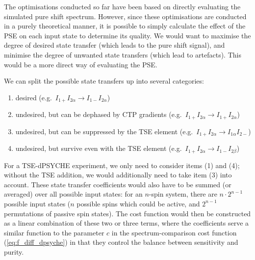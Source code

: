The optimisations conducted so far have been based on directly evaluating the simulated pure shift spectrum.
However, since these optimisations are conducted in a purely theoretical manner, it is possible to simply calculate the effect of the PSE on each input state to determine its quality.
We would want to maximise the degree of desired state transfer (which leads to the pure shift signal), and minimise the degree of unwanted state transfers (which lead to artefacts).
This would be a more direct way of evaluating the PSE.

We can split the possible state transfers up into several categories:
\begin{enumerate}
    \item desired (e.g.\ $I_{1+}I_{2\alpha} \to I_{1-}I_{2\alpha}$)
    \item undesired, but can be dephased by CTP gradients (e.g.\ $I_{1+}I_{2\alpha} \to I_{1+}I_{2\alpha}$)
    \item undesired, but can be suppressed by the TSE element (e.g.\ $I_{1+}I_{2\alpha} \to I_{1\alpha}I_{2-}$)
    \item undesired, but survive even with the TSE element (e.g.\ $I_{1+}I_{2\alpha} \to I_{1-}I_{2\beta}$)
\end{enumerate}
For a TSE-dPSYCHE experiment, we only need to consider items (1) and (4); without the TSE addition, we would additionally need to take item (3) into account.
These state transfer coefficients would also have to be summed (or averaged) over all possible input states: for an $n$-spin system, there are $n \cdot 2^{n-1}$ possible input states ($n$ possible spins which could be active, and $2^{n-1}$ permutations of passive spin states).
The cost function would then be constructed as a linear combination of these two or three terms, where the coefficients serve a similar function to the parameter $c$ in the spectrum-comparison cost function (\cref{eq:f_diff_dpsyche}) in that they control the balance between sensitivity and purity.

